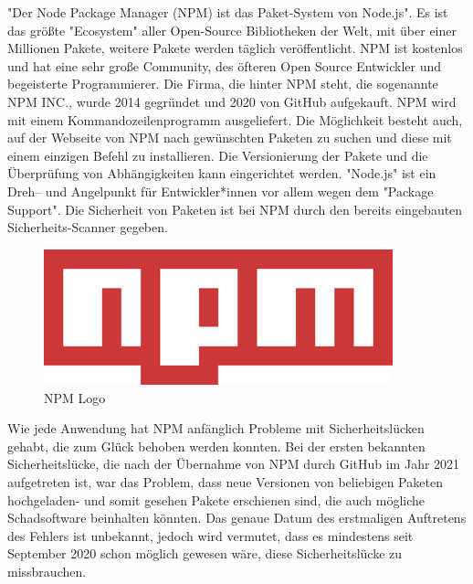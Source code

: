 "Der Node Package Manager (NPM) ist das Paket-System von Node.js". \cite{NPMIntro} Es ist das größte "Ecosystem" aller Open-Source Bibliotheken der Welt, mit über einer Millionen Pakete, weitere Pakete werden täglich veröffentlicht. NPM ist kostenlos und hat eine sehr große Community, des öfteren Open Source Entwickler und begeisterte Programmierer. Die Firma, die hinter NPM steht, die sogenannte NPM INC., wurde 2014 gegründet und 2020 von GitHub aufgekauft.
NPM wird mit einem Kommandozeilenprogramm ausgeliefert. Die Möglichkeit besteht auch, auf der Webseite von NPM nach gewünschten Paketen zu suchen und diese mit einem einzigen Befehl zu installieren. Die Versionierung der Pakete und die Überprüfung von Abhängigkeiten kann eingerichtet werden. "Node.js" ist ein Dreh– und Angelpunkt für Entwickler*innen vor allem wegen dem "Package Support".
Die Sicherheit von Paketen ist bei NPM durch den bereits eingebauten Sicherheits-Scanner gegeben. \cite{NPM} \cite{NPM2} \cite{NPMIntro}


\begin{figure}[H]
    \centering
    \includegraphics[width=0.9\textwidth]{media/NodeJs/NPM.png}
    \caption{NPM Logo \cite{NPMLOGO}}
\end{figure}

\begin{minipage}\textwidth
{}
Wie jede Anwendung hat NPM anfänglich Probleme mit Sicherheitslücken gehabt, die zum Glück behoben werden konnten. Bei der ersten bekannten Sicherheitslücke, die nach der Übernahme von NPM durch GitHub im Jahr 2021 aufgetreten ist, war das Problem, dass neue Versionen von beliebigen Paketen hochgeladen- und somit gesehen Pakete erschienen sind, die auch mögliche Schadsoftware beinhalten könnten. Das genaue Datum des erstmaligen Auftretens des Fehlers ist unbekannt, jedoch wird vermutet, dass es mindestens seit September 2020 schon möglich gewesen wäre, diese Sicherheitslücke zu missbrauchen. \cite{NPMSecurity}
\end{minipage}


